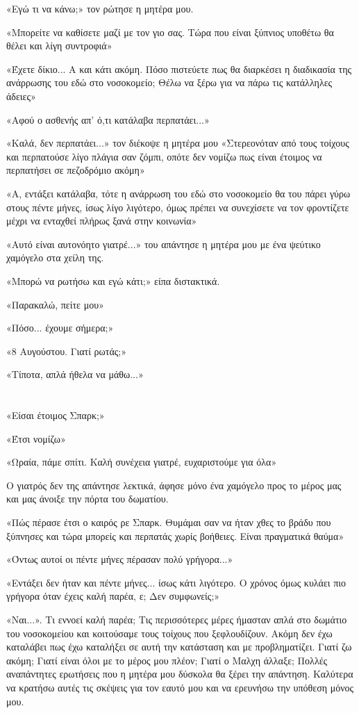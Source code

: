 \documentclass[12pt,twoside, openany]{book}
\begin{document}
«Εγώ τι να κάνω;» τον ρώτησε η μητέρα μου.

«Μπορείτε να καθίσετε μαζί με τον γιο σας. Τώρα που είναι ξύπνιος υποθέτω θα θέλει και λίγη συντροφιά»

«Έχετε δίκιο... Α και κάτι ακόμη. Πόσο πιστεύετε πως θα διαρκέσει η διαδικασία της ανάρρωσης του εδώ στο νοσοκομείο; Θέλω να ξέρω για να πάρω τις κατάλληλες άδειες»

«Αφού ο ασθενής απ’ ό,τι κατάλαβα περπατάει...»

«Καλά, δεν περπατάει...» τον διέκοψε η μητέρα μου «Στερεονόταν από τους τοίχους και περπατούσε λίγο πλάγια σαν ζόμπι, οπότε δεν νομίζω πως είναι έτοιμος να περπατήσει σε πεζοδρόμιο ακόμη»

«Α, εντάξει κατάλαβα, τότε η ανάρρωση του εδώ στο νοσοκομείο θα του πάρει γύρω στους πέντε μήνες, ίσως λίγο λιγότερο, όμως πρέπει να συνεχίσετε να τον φροντίζετε μέχρι να ενταχθεί πλήρως ξανά στην κοινωνία»

«Αυτό είναι αυτονόητο γιατρέ...» του απάντησε η μητέρα μου με ένα ψεύτικο χαμόγελο στα χείλη της.

«Μπορώ να ρωτήσω και εγώ κάτι;» είπα διστακτικά.

«Παρακαλώ, πείτε μου»

«Πόσο... έχουμε σήμερα;»

«8 Αυγούστου. Γιατί ρωτάς;»

«Τίποτα, απλά ήθελα να μάθω...»

\chapter{}

«Είσαι έτοιμος Σπαρκ;»

«Έτσι νομίζω»

«Ωραία, πάμε σπίτι. Καλή συνέχεια γιατρέ, ευχαριστούμε για όλα»

Ο γιατρός δεν της απάντησε λεκτικά, άφησε μόνο ένα χαμόγελο προς το μέρος μας και μας άνοιξε την πόρτα του δωματίου.

«Πώς πέρασε έτσι ο καιρός ρε Σπαρκ. Θυμάμαι σαν να ήταν χθες το βράδυ που ξύπνησες και τώρα μπορείς και περπατάς χωρίς βοήθειες. Είναι πραγματικά θαύμα»

«Όντως αυτοί οι πέντε μήνες πέρασαν πολύ γρήγορα...»

«Εντάξει δεν ήταν και πέντε μήνες... ίσως κάτι λιγότερο. Ο χρόνος όμως κυλάει πιο γρήγορα όταν έχεις καλή παρέα, ε; Δεν συμφωνείς;»

«Ναι...». Τι εννοεί καλή παρέα; Τις περισσότερες μέρες ήμασταν απλά στο δωμάτιο του νοσοκομείου και κοιτούσαμε τους τοίχους που ξεφλουδίζουν. Ακόμη δεν έχω καταλάβει πως έχω καταλήξει σε αυτή την κατάσταση και με προβληματίζει. Γιατί ζω ακόμη; Γιατί είναι όλοι με το μέρος μου πλέον; Γιατί ο Μαλχη άλλαξε; Πολλές αναπάντητες ερωτήσεις που η μητέρα μου δύσκολα θα ξέρει την απάντηση. Καλύτερα να κρατήσω αυτές τις σκέψεις για τον εαυτό μου και να ερευνήσω την υπόθεση μόνος μου.
\end{document}
